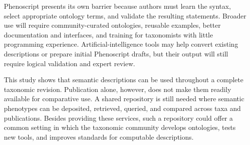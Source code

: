 Phenoscript presents its own barrier because authors must learn the syntax, select appropriate ontology terms, and validate the resulting statements. Broader use will require community-curated ontologies, reusable examples, better documentation and interfaces, and training for taxonomists with little programming experience. Artificial-intelligence tools may help convert existing descriptions or prepare initial Phenoscript drafts, but their output will still require logical validation and expert review.

This study shows that semantic descriptions can be used throughout a complete taxonomic revision. Publication alone, however, does not make them readily available for comparative use. A shared repository is still needed where semantic phenotypes can be deposited, retrieved, queried, and compared across taxa and publications. Besides providing these services, such a repository could offer a common setting in which the taxonomic community develops ontologies, tests new tools, and improves standards for computable descriptions.
